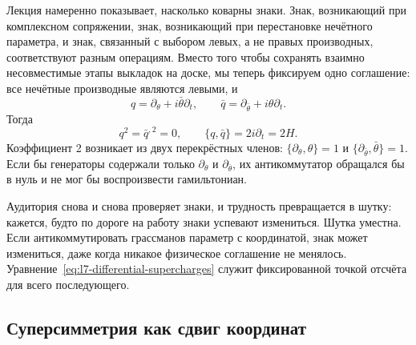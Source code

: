 Лекция намеренно показывает, насколько коварны знаки. Знак, возникающий при комплексном сопряжении, знак, возникающий при перестановке нечётного параметра, и знак, связанный с выбором левых, а не правых производных, соответствуют разным операциям. Вместо того чтобы сохранять взаимно несовместимые этапы выкладок на доске, мы теперь фиксируем одно соглашение: все нечётные производные являются левыми, и
\begin{equation}
q=\partial_\theta+i\bar\theta\partial_t,
\qquad
\bar q=\partial_{\bar\theta}+i\theta\partial_t.
\label{eq:l7-differential-supercharges}
\end{equation}
Тогда
\begin{equation}
q^2=\bar q^{,2}=0,
\qquad
\{q,\bar q\}=2i\partial_t=2H.
\label{eq:l7-differential-algebra}
\end{equation}
Коэффициент 2 возникает из двух перекрёстных членов: \(\{\partial_\theta,\theta\}=1\) и \(\{\partial_{\bar\theta},\bar\theta\}=1\). Если бы генераторы содержали только \(\partial_\theta\) и \(\partial_{\bar\theta}\), их антикоммутатор обращался бы в нуль и не мог бы воспроизвести гамильтониан.

\begin{classroomqa}
\end{classroomqa}

Аудитория снова и снова проверяет знаки, и трудность превращается в шутку: кажется, будто по дороге на работу знаки успевают измениться. Шутка уместна. Если антикоммутировать грассманов параметр с координатой, знак может измениться, даже когда никакое физическое соглашение не менялось. Уравнение~\eqref{eq:l7-differential-supercharges} служит фиксированной точкой отсчёта для всего последующего.

\subsection{Суперсимметрия как сдвиг координат}

